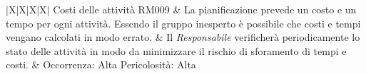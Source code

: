 \begin{tabularx}{\textwidth}{|X|X|X|X|}
	Costi delle attività \newline RM009 & La pianificazione prevede un costo e un tempo per ogni attività. Essendo il gruppo inesperto è possibile che costi e tempi vengano calcolati in modo errato. & Il \textit{Responsabile} verificherà periodicamente lo stato delle attività in modo da minimizzare il rischio di sforamento di tempi e costi. & Occorrenza: Alta \newline Pericolosità: Alta \\
	\hline
	\\
	\hline	
	\caption{Elenco dei rischi}\\
    \end{tabularx}

